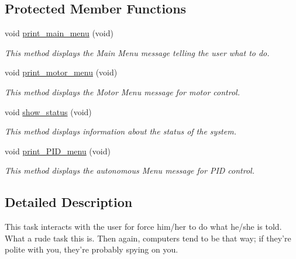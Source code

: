 \subsection*{Protected Member Functions}
\begin{DoxyCompactItemize}
\item 
\hypertarget{classtask__user_a36c99836d2ee036858d4a0ab61c2d5ec}{void \hyperlink{classtask__user_a36c99836d2ee036858d4a0ab61c2d5ec}{print\-\_\-main\-\_\-menu} (void)}\label{classtask__user_a36c99836d2ee036858d4a0ab61c2d5ec}

\begin{DoxyCompactList}\small\item\em This method displays the Main Menu message telling the user what to do. \end{DoxyCompactList}\item 
\hypertarget{classtask__user_ae4c8890b06e117f57095951eee64c64f}{void \hyperlink{classtask__user_ae4c8890b06e117f57095951eee64c64f}{print\-\_\-motor\-\_\-menu} (void)}\label{classtask__user_ae4c8890b06e117f57095951eee64c64f}

\begin{DoxyCompactList}\small\item\em This method displays the Motor Menu message for motor control. \end{DoxyCompactList}\item 
void \hyperlink{classtask__user_a105bebbd9cb1031154c3dfc3662db4a0}{show\-\_\-status} (void)
\begin{DoxyCompactList}\small\item\em This method displays information about the status of the system. \end{DoxyCompactList}\item 
\hypertarget{classtask__user_ad5cd567087263414af48c9bdfc655eba}{void \hyperlink{classtask__user_ad5cd567087263414af48c9bdfc655eba}{print\-\_\-\-P\-I\-D\-\_\-menu} (void)}\label{classtask__user_ad5cd567087263414af48c9bdfc655eba}

\begin{DoxyCompactList}\small\item\em This method displays the autonomous Menu message for P\-I\-D control. \end{DoxyCompactList}\end{DoxyCompactItemize}


\subsection{Detailed Description}
This task interacts with the user for force him/her to do what he/she is told. What a rude task this is. Then again, computers tend to be that way; if they're polite with you, they're probably spying on you. 

